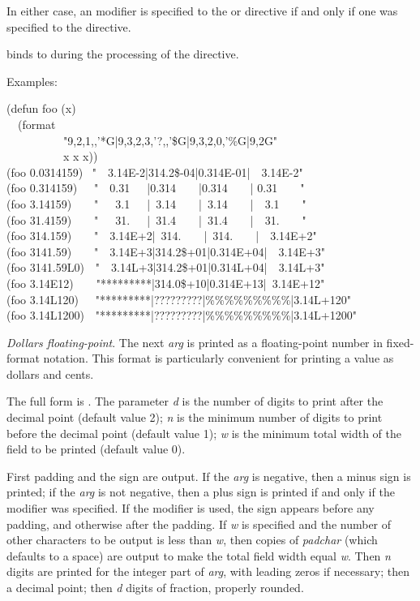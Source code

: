 \begin{flushdesc}
In either case, an \cd{{\Xatsign}} modifier is specified to the 
or  directive if and only if one was specified to the
 directive.

 binds  to 
during the processing of the  directive.

Examples:
\begin{lisp}
(defun foo (x) \\
~~(format {\nil} \\
~~~~~~~~~~"{\Xtilde}9,2,1,,'*G|{\Xtilde}9,3,2,3,'?,,'\$G|{\Xtilde}9,3,2,0,'\%G|{\Xtilde}9,2G" \\
~~~~~~~~~~x x x)) \\[10pt]
(foo 0.0314159) \EV\ "~~3.14E-2|314.2\$-04|0.314E-01|~~3.14E-2" \\
(foo 0.314159)~~\EV\ "~~0.31~~~|0.314~~~~|0.314~~~~| 0.31~~~~" \\
(foo 3.14159)~~~\EV\ "~~~3.1~~~|~3.14~~~~|~3.14~~~~|~~3.1~~~~" \\
(foo 31.4159)~~~\EV\ "~~~31.~~~|~31.4~~~~|~31.4~~~~|~~31.~~~~" \\
(foo 314.159)~~~\EV\ "~~3.14E+2|~314.~~~~|~314.~~~~|~~3.14E+2" \\
(foo 3141.59)~~~\EV\ "~~3.14E+3|314.2\$+01|0.314E+04|~~3.14E+3" \\
(foo 3141.59L0)~\EV\ "~~3.14L+3|314.2\$+01|0.314L+04|~~3.14L+3" \\
(foo 3.14E12)~~~\EV\ "*********|314.0\$+10|0.314E+13|~3.14E+12" \\
(foo 3.14L120)~~\EV\ "*********|?????????|\%\%\%\%\%\%\%\%\%|3.14L+120" \\
(foo 3.14L1200)~\EV\ "*********|?????????|\%\%\%\%\%\%\%\%\%|3.14L+1200"
\end{lisp}
\newpage%

\item[\cd{{\Xtilde}\$}]
\emph{Dollars floating-point}.  The next \emph{arg} is printed as a floating-point
number in fixed-format notation.  This format is particularly
convenient for printing a value as dollars and cents.

The full form is .
The parameter \emph{d} is the number
of digits to print after the decimal point (default value 2);
\emph{n} is the minimum number of digits to print before the decimal
point (default value 1);
\emph{w} is the minimum total width of the field to be printed (default
value 0).

First padding and the sign are output.
If the \emph{arg} is negative, then a minus sign is printed;
if the \emph{arg} is not negative, then a plus sign is printed
if and only if the \cd{{\Xatsign}} modifier was specified.  
If the \cd{:} modifier is used, the sign appears before any padding,
and otherwise after the padding.
If \emph{w} is specified and the number of other characters to be output
is less than \emph{w}, then copies of \emph{padchar} (which defaults
to a space) are output to
make the total field width equal \emph{w}.
Then \emph{n} digits are printed for the integer part of \emph{arg},
with leading zeros if necessary; then a decimal point;
then \emph{d} digits of fraction, properly rounded.


\end{flushdesc}
